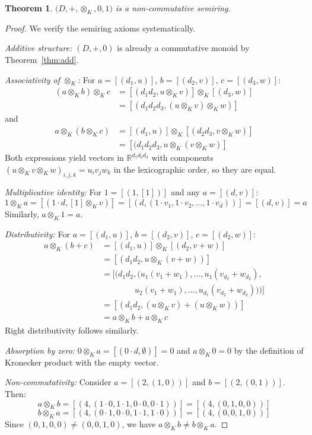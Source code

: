 \documentclass[11pt]{article}
\newtheorem{theorem}{Theorem}[section]
\begin{document}
\begin{theorem}
\(\bigl(D,+,\otimes_K,0,1\bigr)\) is a non‑commutative semiring.
\end{theorem}
\begin{proof}
We verify the semiring axioms systematically.

\textit{Additive structure:} $(D,+,0)$ is already a commutative monoid by Theorem~\ref{thm:add}.

\textit{Associativity of $\otimes_K$:} For $a = [(d_1,u)]$, $b = [(d_2,v)]$, $c = [(d_3,w)]$:
\begin{align}
(a \otimes_K b) \otimes_K c &= [(d_1 d_2, u \otimes_K v)] \otimes_K [(d_3,w)] \\
&= [(d_1 d_2 d_3, (u \otimes_K v) \otimes_K w)]
\end{align}
and
\begin{align}
a \otimes_K (b \otimes_K c) &= [(d_1,u)] \otimes_K [(d_2 d_3, v \otimes_K w)] \\
&= [(d_1 d_2 d_3, u \otimes_K (v \otimes_K w)]
\end{align}
Both expressions yield vectors in $\mathbb{R}^{d_1 d_2 d_3}$ with components $(u \otimes_K v \otimes_K w)_{i,j,k} = u_i v_j w_k$ in the lexicographic order, so they are equal.

\textit{Multiplicative identity:} For $1 = [(1,[1])]$ and any $a = [(d,v)]$:
\[1 \otimes_K a = [(1 \cdot d, [1] \otimes_K v)] = [(d, (1 \cdot v_1, 1 \cdot v_2, \ldots, 1 \cdot v_d))] = [(d,v)] = a\]
Similarly, $a \otimes_K 1 = a$.

\textit{Distributivity:} For $a = [(d_1,u)]$, $b = [(d_2,v)]$, $c = [(d_2,w)]$:
\begin{align}
a \otimes_K (b + c) &= [(d_1,u)] \otimes_K [(d_2, v + w)] \\
&= [(d_1 d_2, u \otimes_K (v + w))] \\
&= [(d_1 d_2, (u_1(v_1 + w_1), \ldots, u_1(v_{d_2} + w_{d_2}), \\
&\qquad\qquad u_2(v_1 + w_1), \ldots, u_{d_1}(v_{d_2} + w_{d_2})))] \\
&= [(d_1 d_2, (u \otimes_K v) + (u \otimes_K w))] \\
&= a \otimes_K b + a \otimes_K c
\end{align}
Right distributivity follows similarly.

\textit{Absorption by zero:} $0 \otimes_K a = [(0 \cdot d, \emptyset)] = 0$ and $a \otimes_K 0 = 0$ by the definition of Kronecker product with the empty vector.

\textit{Non-commutativity:} Consider $a = [(2, (1,0))]$ and $b = [(2, (0,1))]$. Then:
\[a \otimes_K b = [(4, (1 \cdot 0, 1 \cdot 1, 0 \cdot 0, 0 \cdot 1))] = [(4, (0,1,0,0))]\]
\[b \otimes_K a = [(4, (0 \cdot 1, 0 \cdot 0, 1 \cdot 1, 1 \cdot 0))] = [(4, (0,0,1,0))]\]
Since $(0,1,0,0) \neq (0,0,1,0)$, we have $a \otimes_K b \neq b \otimes_K a$.
\qedhere
\end{proof}
\end{document}
